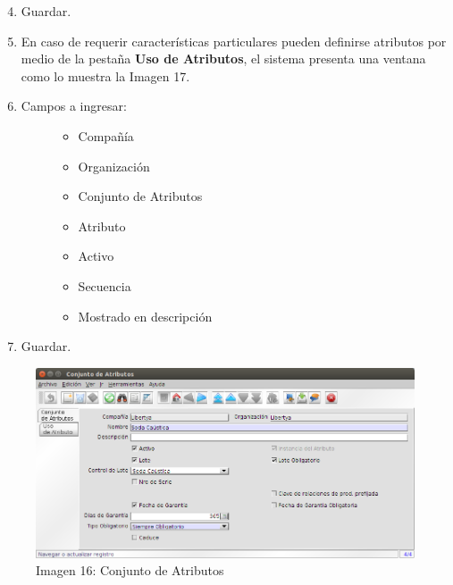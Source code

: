 \documentclass[letterpaper,10pt,spanish]{sphinxmanual}
\begin{document}
\begin{enumerate}
\setcounter{enumi}{3}
\item {} 
Guardar.

\item {} 
En caso de requerir características particulares pueden definirse atributos por medio de la pestaña \textbf{Uso de Atributos}, el sistema presenta una ventana como lo muestra la Imagen 17.

\item {} \begin{description}
\item[{Campos a ingresar:}] \leavevmode\begin{itemize}
\item {} 
Compañía

\item {} 
Organización

\item {} 
Conjunto de Atributos

\item {} 
Atributo

\item {} 
Activo

\item {} 
Secuencia

\item {} 
Mostrado en descripción

\end{itemize}

\end{description}

\item {} 
Guardar.

\end{enumerate}
\begin{figure}[htbp]
\centering
\capstart

\includegraphics{ly_conjattr_1.png}
\caption{Imagen 16: Conjunto de Atributos}\end{figure}
\end{document}
